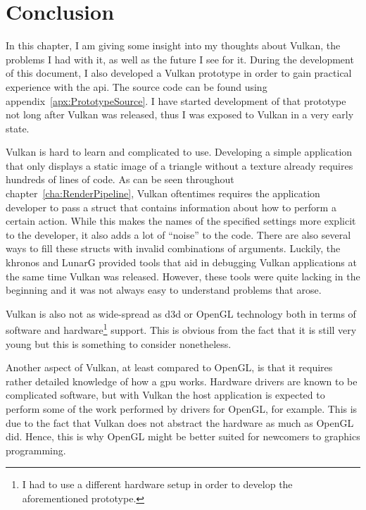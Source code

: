 
\chapter{Conclusion}
\label{cha:Conclusion}

  In this chapter, I am giving some insight into my thoughts about Vulkan, the problems I had with it, as well as the future I see for it.
  During the development of this document, I also developed a Vulkan prototype in order to gain practical experience with the \gls{api}.
  The source code can be found using appendix~\ref{apx:PrototypeSource}.
  I have started development of that prototype not long after Vulkan was released, thus I was exposed to Vulkan in a very early state.

  Vulkan is hard to learn and complicated to use.
  Developing a simple application that only displays a static image of a triangle without a texture already requires hundreds of lines of code.
  As can be seen throughout chapter~\ref{cha:RenderPipeline}, Vulkan oftentimes requires the application developer to pass a struct that contains information about how to perform a certain action.
  While this makes the names of the specified settings more explicit to the developer, it also adds a lot of ``noise'' to the code.
  There are also several ways to fill these structs with invalid combinations of arguments.
  Luckily, the \gls{khronos} and LunarG provided tools that aid in debugging Vulkan applications at the same time Vulkan was released.
  However, these tools were quite lacking in the beginning and it was not always easy to understand problems that arose.

  Vulkan is also not as wide-spread as \gls{d3d} or OpenGL technology both in terms of software and hardware\footnote{I had to use a different hardware setup in order to develop the aforementioned prototype.} support.
  This is obvious from the fact that it is still very young but this is something to consider nonetheless.

  Another aspect of Vulkan, at least compared to OpenGL, is that it requires rather detailed knowledge of how a \gls{gpu} works.
  Hardware drivers are known to be complicated software, but with Vulkan the host application is expected to perform some of the work performed by drivers for OpenGL, for example.
  This is due to the fact that Vulkan does not abstract the hardware as much as OpenGL did.
  Hence, this is why OpenGL might be better suited for newcomers to graphics programming.

